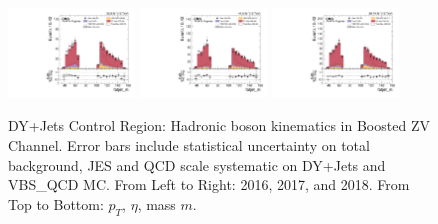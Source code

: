 \begin{figure}[!ht]
  \includegraphics[width=0.30\textwidth]{analysis_plots/2016_zv/cr_vjets_l/fatjet_m.pdf}
  \includegraphics[width=0.30\textwidth]{analysis_plots/2017_zv/cr_vjets_l/fatjet_m.pdf}
  \includegraphics[width=0.30\textwidth]{analysis_plots/2018_zv/cr_vjets_l/fatjet_m.pdf} \\
  \caption[DY+Jets Control Region: Hadronic boson kinematics in Boosted ZV Channel]%
  {DY+Jets Control Region: Hadronic boson kinematics in Boosted ZV Channel.
    Error bars include statistical uncertainty on total background,
    JES and QCD scale systematic on DY+Jets and VBS\_QCD MC\@. From Left to Right: 2016,
    2017, and 2018. From Top to Bottom: \( p_T \), \( \eta \), mass \( m \).}%
  \label{fig:zv-cr-vjets-l-fatjet-pt-eta-m}
\end{figure}


